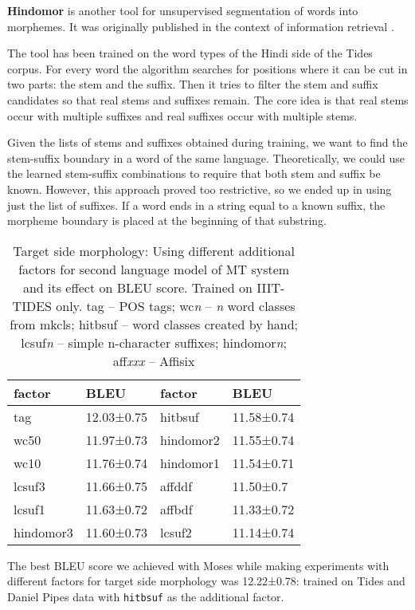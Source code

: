 \documentclass[11pt]{article}
\begin{document}
\label{sec:hindomor}
{\bf Hindomor} is another tool for unsupervised segmentation of words into
morphemes. It was originally published in the context of information
retrieval \citep{Zeman:2008}.

The tool has been trained on the word types of the Hindi side of the Tides
corpus. For every word the algorithm searches for positions where it can be cut
in two parts: the stem and the suffix. Then it tries to filter the stem and
suffix candidates so that real stems and suffixes remain. The core idea is that
real stems occur with multiple suffixes and real suffixes occur with multiple
stems.

Given the lists of stems and suffixes obtained during training, we want to find
the stem-suffix boundary in a word of the same language. Theoretically, we could
use the learned stem-suffix combinations to require that both stem and suffix be
known. However, this approach proved too restrictive, so we ended up in using
just the list of suffixes. If a word ends in a string equal to a known suffix,
the morpheme boundary is placed at the beginning of that substring.


\begin{table}[t]
\begin{center}
\small
\begin{tabular}{l  l | ll}
factor & BLEU &
factor & BLEU\\
\hline
tag & 12.03±0.75 &	hitbsuf & 11.58±0.74\\
wc50 & 11.97±0.73 &	hindomor2 & 11.55±0.74\\
wc10 & 11.76±0.74 &	hindomor1 & 11.54±0.71\\
lcsuf3 & 11.66±0.75 &	affddf & 11.50±0.7\\
lcsuf1 & 11.63±0.72 &	affbdf & 11.33±0.72\\
hindomor3 & 11.60±0.73 &	lcsuf2 & 11.14±0.74\\
\end{tabular}
\end{center}
\caption{Target side morphology: Using different additional factors for second
language model of MT system and its  effect on BLEU score. Trained on
IIIT-TIDES only. 
tag -- POS tags; wc\textit{n} -- \textit{n} word classes from mkcls; hitbsuf --
word classes created by hand; lcsuf\textit{n} -- simple
n-character suffixes; hindomor\textit{n};
aff\textit{xxx} -- Affisix
} 
\label{tab:morph}
\end{table}


The best BLEU score we achieved with Moses while making experiments with different
factors for target side morphology was 12.22±0.78:
trained on Tides and Daniel Pipes data with \texttt{hitbsuf}
as the additional factor.
\end{document}
